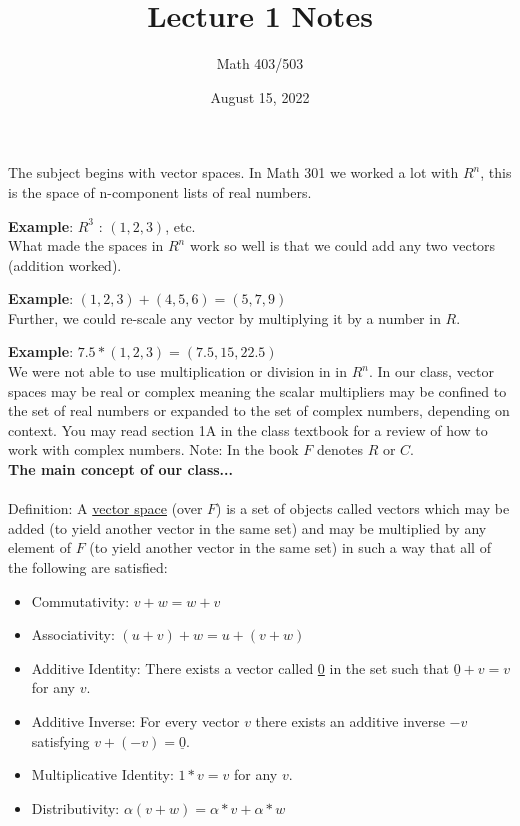 \documentclass{article}
\title{Lecture 1 Notes}
\author{Math 403/503 }
\date{August 15, 2022}
\begin{document}
\maketitle

The subject begins with vector spaces. In Math 301 we worked a lot with  $R^n$,
this is the space of n-component lists of real numbers. 

\textbf{Example}: ${R^3}$ : $(1, 2, 3)$, etc. \\

What made the spaces in $R^n$ work so well is that we could add any two vectors (addition worked). 

\textbf{Example}: $(1, 2, 3) + (4, 5, 6) = (5, 7, 9)$\\

Further, we could re-scale any vector by multiplying it by a number in $R$.

\textbf{Example}: $7.5*(1, 2, 3) = (7.5, 15, 22.5)$ \\

We were not able to use multiplication or division in in $R^n$. In our class, vector spaces may be real or complex meaning the scalar multipliers may be confined to the set of real numbers or expanded to the set of complex numbers, depending on context. You may read section 1A in the class textbook for a review of how to work with complex numbers. Note: In the book $F$ denotes $R$ or $C$. \\

\textbf{The main concept of our class...}\\ \\

Definition: A \underline{vector space} (over $F$) is a set of objects called vectors which may be added (to yield another vector in the same set) and may be multiplied by any element of $F$ (to yield another vector in the same set) in such a way that all of the following are satisfied: \\

\begin{itemize}
    \item Commutativity: $ v + w = w + v$ 
    \item Associativity: $(u + v) + w = u + (v + w)$
    \item Additive Identity: There exists a vector called \underline{0} in the set such that $\underline{0} + v = v$ for any $v$. 
    \item Additive Inverse: For every vector $v$ there exists an additive inverse $-v$ satisfying $v + (-v) = \underline{0}$.
    \item Multiplicative Identity: $1*v = v$ for any $v$. 
    \item Distributivity: $\alpha(v + w) = \alpha*v + \alpha*w$
\end{itemize} 
\end{document}
